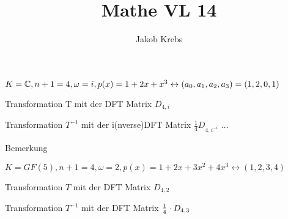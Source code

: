 \documentclass{../tudscript}
\author{Jakob Krebs}
\title{Mathe VL 14}
\begin{document}
$K = \mathbb{C}, n+1 =4, \omega = i, p(x) = 1+2x+x^3 \leftrightarrow (a_0, a_1, a_2, a_3) = (1, 2, 0, 1)$

Transformation T mit der DFT Matrix $D_{4,i}$

Transformation $T^{-1}$ mit der i(nverse)DFT Matrix $\frac{1}{4} D_{4, i^{-i}}$
...

Bemerkung

$K = GF(5), n+1 = 4, \omega = 2, p(x) = 1 + 2x+3x^2 + 4x^3 \leftrightarrow (1,2,3,4)$

Transformation $T$ mit der DFT Matrix $D_{4,2}$

Transformation $T^{-1}$ mit der DFT Matrix $\frac{1}{4} \cdot D_{4,3}$
\end{document}
